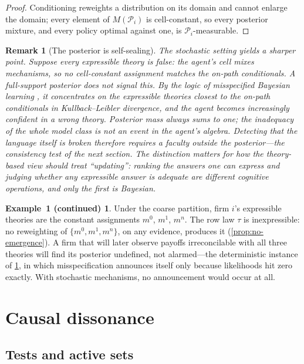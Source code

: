 \documentclass[11pt]{article}
\newtheorem{remark}[assumption]{Remark}
\theoremstyle{definition}
\newtheorem*{excont}{Example~1 (continued)}
\begin{document}
\begin{proof}
Conditioning reweights a distribution on its domain and cannot enlarge the domain; every element of $M(\mathcal P_i)$ is cell-constant, so every posterior mixture, and every policy optimal against one, is $\mathcal P_i$-measurable.
\end{proof}

\begin{remark}[The posterior is self-sealing]
\label{rem:self-sealing}
The stochastic setting yields a sharper point.
Suppose every expressible theory is false: the agent's cell mixes mechanisms, so no cell-constant assignment matches the on-path conditionals.
A full-support posterior does not signal this.
By the logic of misspecified Bayesian learning \citep{Berk1966}, it concentrates on the expressible theories closest to the on-path conditionals in Kullback--Leibler divergence, and the agent becomes increasingly \emph{confident} in a wrong theory.
Posterior mass always sums to one; the inadequacy of the whole model class is not an event in the agent's algebra.
Detecting that the language itself is broken therefore requires a faculty outside the posterior---the consistency test of the next section.
The distinction matters for how the theory-based view should treat ``updating'': ranking the answers one can express and judging whether any expressible answer is adequate are different cognitive operations, and only the first is Bayesian.
\end{remark}

\begin{excont}
Under the coarse partition, firm $i$'s expressible theories are the constant assignments $m^0$, $m^1$, $m^n$.
The row law $\tau$ is inexpressible: no reweighting of $\{m^0,m^1,m^n\}$, on any evidence, produces it (\cref{prop:no-emergence}).
A firm that will later observe payoffs irreconcilable with all three theories will find its posterior undefined, not alarmed---the deterministic instance of \cref{rem:self-sealing}, in which misspecification announces itself only because likelihoods hit zero exactly.
With stochastic mechanisms, no announcement would occur at all.
\end{excont}
\section{Causal dissonance}
\label{sec:dissonance}

\subsection{Tests and active sets}
\end{document}
